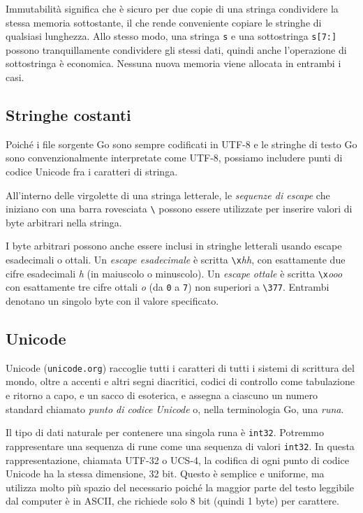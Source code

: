 Immutabilità significa che è sicuro per due copie di una stringa condividere la stessa memoria sottostante, il che rende conveniente copiare le stringhe di qualsiasi lunghezza.
Allo stesso modo, una stringa \verb|s| e una sottostringa \verb|s[7:]| possono tranquillamente condividere gli stessi dati, quindi anche l'operazione di sottostringa è economica.
Nessuna nuova memoria viene allocata in entrambi i casi.

\subsection{Stringhe costanti}
\label{subsec:stringhe_costanti}%
Poiché i file sorgente Go sono sempre codificati in UTF-8 e le stringhe di testo Go sono convenzionalmente interpretate come UTF-8, possiamo includere punti di codice Unicode fra i caratteri di stringa.


All'interno delle virgolette di una stringa letterale, le \textit{sequenze di escape} che iniziano con una barra rovesciata \verb|\| possono essere utilizzate per inserire valori di byte arbitrari nella stringa.

I byte arbitrari possono anche essere inclusi in stringhe letterali usando escape esadecimali o ottali.
Un \textit{escape esadecimale} è scritta \verb|\x|\textit{hh}, con esattamente due cifre esadecimali \textit{h} (in maiuscolo o minuscolo).
Un \textit{escape ottale} è scritta \verb|\x|\textit{ooo} con esattamente tre cifre ottali \textit{o} (da \verb|0| a \verb|7|) non superiori a \verb|\377|.
Entrambi denotano un singolo byte con il valore specificato.

\subsection{Unicode}
\label{subsec:unicode}%
Unicode (\verb|unicode.org|) raccoglie tutti i caratteri di tutti i sistemi di scrittura del mondo, oltre a accenti e altri segni diacritici, codici di controllo come tabulazione e ritorno a capo, e un sacco di esoterica, e assegna a ciascuno un numero standard chiamato \textit{punto di codice Unicode} o, nella terminologia Go, una \textit{runa}.

Il tipo di dati naturale per contenere una singola runa è \verb|int32|.
Potremmo rappresentare una sequenza di rune come una sequenza di valori \verb|int32|.
In questa rappresentazione, chiamata UTF-32 o UCS-4, la codifica di ogni punto di codice Unicode ha la stessa dimensione, 32 bit.
Questo è semplice e uniforme, ma utilizza molto più spazio del necessario poiché la maggior parte del testo leggibile dal computer è in ASCII, che richiede solo 8 bit (quindi 1 byte) per carattere.

